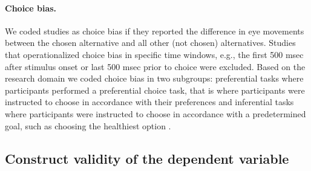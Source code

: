 \documentclass[english,natbib,man,floatsintext]{apa6}
\begin{document}
\paragraph{Choice bias.} We coded studies as choice bias if they reported the difference in eye movements between the chosen alternative and all other (not chosen) alternatives. Studies that operationalized choice bias in specific time windows, e.g., the first 500 msec after stimulus onset or last 500 msec prior to choice \citep{shimojo2003a} were excluded. Based on the research domain we coded choice bias in two subgroups: preferential tasks where participants performed a preferential choice task, that is where participants were instructed to choose in accordance with their preferences \citep{schotter2010a} and inferential tasks where participants were instructed to choose in accordance with a predetermined goal, such as choosing the healthiest option \citep{schotter2012a}.


\subsection{Construct validity of the dependent variable}
\end{document}

